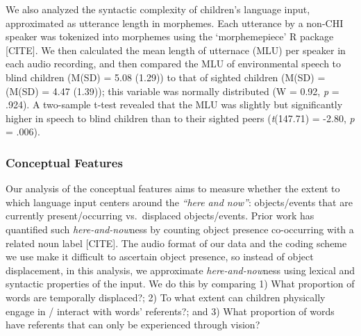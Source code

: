 \documentclass[
  man,floatsintext]{apa6}
\begin{document}
We also analyzed the syntactic complexity of children's language input, approximated as utterance length in morphemes. Each utterance by a non-CHI speaker was tokenized into morphemes using the `morphemepiece' R package {[}CITE{]}. We then calculated the mean length of utternace (MLU) per speaker in each audio recording, and then compared the MLU of environmental speech to blind children (M(SD) = 5.08 (1.29)) to that of sighted children (M(SD) = (M(SD) = 4.47 (1.39)); this variable was normally distributed (W = 0.92, \emph{p} = .924). A two-sample t-test revealed that the MLU was slightly but significantly higher in speech to blind children than to their sighted peers (\emph{t}(147.71) = -2.80, \emph{p} = .006).

\hypertarget{conceptual-features}{%
\subsubsection{Conceptual Features}\label{conceptual-features}}

Our analysis of the conceptual features aims to measure whether the extent to which language input centers around the \emph{``here and now''}: objects/events that are currently present/occurring vs.~displaced objects/events. Prior work has quantified such \emph{here-and-now}ness by counting object presence co-occurring with a related noun label {[}CITE{]}. The audio format of our data and the coding scheme we use make it difficult to ascertain object presence, so instead of object displacement, in this analysis, we approximate \emph{here-and-now}ness using lexical and syntactic properties of the input. We do this by comparing 1) What proportion of words are temporally displaced?; 2) To what extent can children physically engage in / interact with words' referents?; and 3) What proportion of words have referents that can only be experienced through vision?
\end{document}
